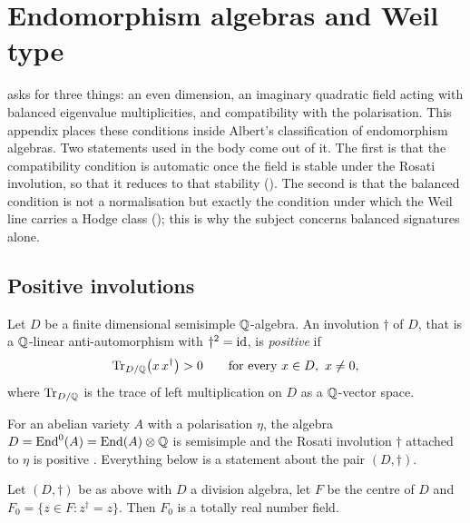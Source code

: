 \section{Endomorphism algebras and Weil type}\label{app:albert}

 asks for three things: an even dimension, an imaginary
quadratic field acting with balanced eigenvalue multiplicities, and
compatibility with the polarisation. This appendix places these conditions
inside Albert's classification of endomorphism algebras. Two statements used
in the body come out of it. The first is that the compatibility condition is
automatic once the field is stable under the Rosati involution, so that it
reduces to that stability (). The second is that the
balanced condition is not a normalisation but exactly the condition under
which the Weil line carries a Hodge class (); this
is why the subject concerns balanced signatures alone.

\subsection{Positive involutions}

\begin{definition}\label{def:positive}
Let $D$ be a finite dimensional semisimple $\mathbb{Q}$-algebra. An involution
$\dagger$ of $D$, that is a $\mathbb{Q}$-linear anti-automorphism with
$\dagger^{2}=\operatorname{id}$, is \emph{positive} if
\[
  \operatorname{Tr}_{D/\mathbb{Q}}\bigl(x\,x^{\dagger}\bigr)>0
  \qquad\text{for every }x\in D,\ x\ne0,
\]
where $\operatorname{Tr}_{D/\mathbb{Q}}$ is the trace of left multiplication on $D$ as a
$\mathbb{Q}$-vector space.
\end{definition}

For an abelian variety $A$ with a polarisation $\eta$, the algebra
$D=\operatorname{End}^{0}(A)=\operatorname{End}(A)\otimes\mathbb{Q}$ is semisimple and the Rosati involution
$\dagger$ attached to $\eta$ is positive \cite[Ch.~5]{BL04}. Everything below
is a statement about the pair $(D,\dagger)$.

\begin{lemma}\label{lem:totallyreal}
Let $(D,\dagger)$ be as above with $D$ a division algebra, let $F$ be the
centre of $D$ and $F_{0}=\{z\in F:z^{\dagger}=z\}$. Then $F_{0}$ is a totally
real number field.
\end{lemma}

